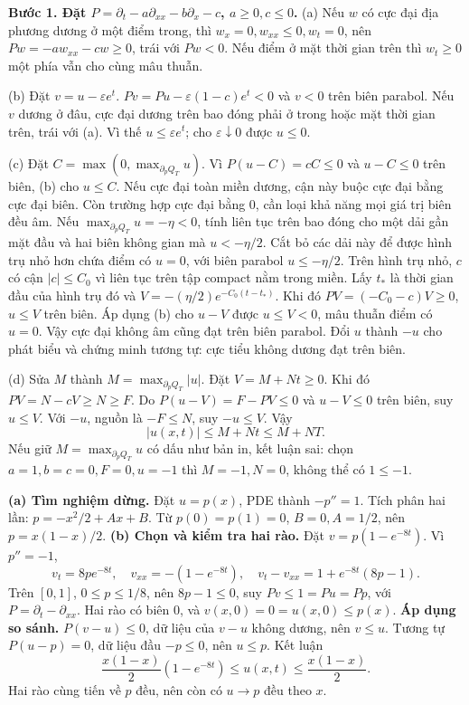 \textbf{Bước 1. Đặt $P=\partial_t-a\partial_{xx}-b\partial_x-c$, $a\ge0,c\le0$.}
(a) Nếu $w$ có cực đại địa phương dương ở một điểm trong, thì $w_x=0,w_{xx}\le0,w_t=0$, nên $Pw=-aw_{xx}-cw\ge0$, trái với $Pw<0$. Nếu điểm ở mặt thời gian trên thì $w_t\ge0$ một phía vẫn cho cùng mâu thuẫn.

(b) Đặt $v=u-\varepsilon e^t$. $Pv=Pu-\varepsilon(1-c)e^t<0$ và $v<0$ trên biên parabol. Nếu $v$ dương ở đâu, cực đại dương trên bao đóng phải ở trong hoặc mặt thời gian trên, trái với (a). Vì thế $u\le\varepsilon e^t$; cho $\varepsilon\downarrow0$ được $u\le0$.

(c) Đặt $C=\max(0,\max_{\partial_pQ_T}u)$. Vì $P(u-C)=cC\le0$ và $u-C\le0$ trên biên, (b) cho $u\le C$. Nếu cực đại toàn miền dương, cận này buộc cực đại bằng cực đại biên. Còn trường hợp cực đại bằng $0$, cần loại khả năng mọi giá trị biên đều âm.
Nếu $\max_{\partial_pQ_T}u=-\eta<0$, tính liên tục trên bao đóng cho một dải gần mặt đầu và hai biên không gian mà $u<-\eta/2$. Cắt bỏ các dải này để được hình trụ nhỏ hơn chứa điểm có $u=0$, với biên parabol $u\le-\eta/2$. Trên hình trụ nhỏ, $c$ có cận $|c|\le C_0$ vì liên tục trên tập compact nằm trong miền. Lấy $t_*$ là thời gian đầu của hình trụ đó và $V=-(\eta/2)e^{-C_0(t-t_*)}$. Khi đó $PV=(-C_0-c)V\ge0$, $u\le V$ trên biên. Áp dụng (b) cho $u-V$ được $u\le V<0$, mâu thuẫn điểm có $u=0$. Vậy cực đại không âm cũng đạt trên biên parabol. Đổi $u$ thành $-u$ cho phát biểu và chứng minh tương tự: cực tiểu không dương đạt trên biên.

(d) Sửa $M$ thành $M=\max_{\partial_pQ_T}|u|$. Đặt $V=M+Nt\ge0$. Khi đó $PV=N-cV\ge N\ge F$. Do $P(u-V)=F-PV\le0$ và $u-V\le0$ trên biên, suy $u\le V$. Với $-u$, nguồn là $-F\le N$, suy $-u\le V$. Vậy
\[|u(x,t)|\le M+Nt\le M+NT.\]
Nếu giữ $M=\max_{\partial_pQ_T}u$ có dấu như bản in, kết luận sai: chọn $a=1,b=c=0,F=0,u=-1$ thì $M=-1,N=0$, không thể có $1\le-1$.

\textbf{(a) Tìm nghiệm dừng.} Đặt $u=p(x)$, PDE thành $-p''=1$. Tích phân hai lần: $p=-x^2/2+Ax+B$. Từ $p(0)=p(1)=0$, $B=0,A=1/2$, nên $p=x(1-x)/2$.
\textbf{(b) Chọn và kiểm tra hai rào.} Đặt $v=p(1-e^{-8t})$. Vì $p''=-1$,
\[v_t=8pe^{-8t},\quad v_{xx}=-(1-e^{-8t}),\quad
v_t-v_{xx}=1+e^{-8t}(8p-1).\]
Trên $[0,1]$, $0\le p\le1/8$, nên $8p-1\le0$, suy $Pv\le1=Pu= Pp$, với $P=\partial_t-\partial_{xx}$. Hai rào có biên $0$, và $v(x,0)=0=u(x,0)\le p(x)$.
\textbf{Áp dụng so sánh.} $P(v-u)\le0$, dữ liệu của $v-u$ không dương, nên $v\le u$. Tương tự $P(u-p)=0$, dữ liệu đầu $-p\le0$, nên $u\le p$. Kết luận
\[\frac{x(1-x)}2(1-e^{-8t})\le u(x,t)\le\frac{x(1-x)}2.\]
Hai rào cùng tiến về $p$ đều, nên còn có $u\to p$ đều theo $x$.

